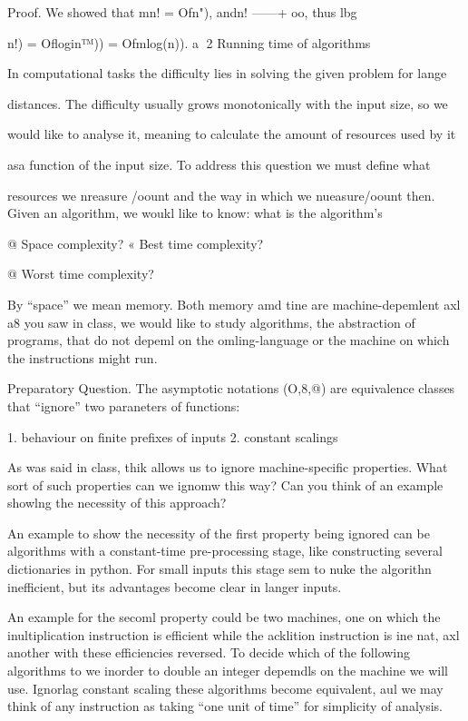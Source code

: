 Proof. We showed that mn! = Ofn"), andn! ——+ oo, thus lbg{n!) = Oflogin™)) =
Ofmlog(n)). a
2 Running time of algorithms

In computational tasks the difficulty lies in solving the given problem for lange

distances. The difficulty usually grows monotonically with the input size, so we

would like to analyse it, meaning to calculate the amount of resources used by it

asa function of the input size. To address this question we must define what

resources we nreasure /oount and the way in which we nueasure/oount then.
Given an algorithm, we woukl like to know: what is the algorithm's

@ Space complexity?
« Best time complexity?

@ Worst time complexity?

By “space” we mean memory. Both memory amd tine are machine-depemlent
axl a8 you saw in class, we would like to study algorithms, the abstraction of
programs, that do not depeml on the omling-language or the machine on which
the instructions might run.

Preparatory Question. The asymptotic notations (O,8,@) are equivalence
classes that “ignore” two paraneters of functions:

1. behaviour on finite prefixes of inputs
2. constant scalings

As was said in class, thik allows us to ignore machine-specific properties. What
sort of such properties can we ignomw this way? Can you think of an example
showlng the necessity of this approach?

An example to show the necessity of the first property being ignored can be
algorithms with a constant-time pre-processing stage, like constructing several
dictionaries in python. For small inputs this stage sem to nuke the algorithn
inefficient, but its advantages become clear in langer inputs.

An example for the secoml property could be two machines, one on which the
inultiplication instruction is efficient while the acklition instruction is ine nat,
axl another with these efficiencies reversed. To decide which of the following
algorithms to we inorder to double an integer depemdls on the machine we will
use. Ignorlag constant scaling these algorithms become equivalent, aul we may
think of any instruction as taking “one unit of time” for simplicity of analysis.

}
